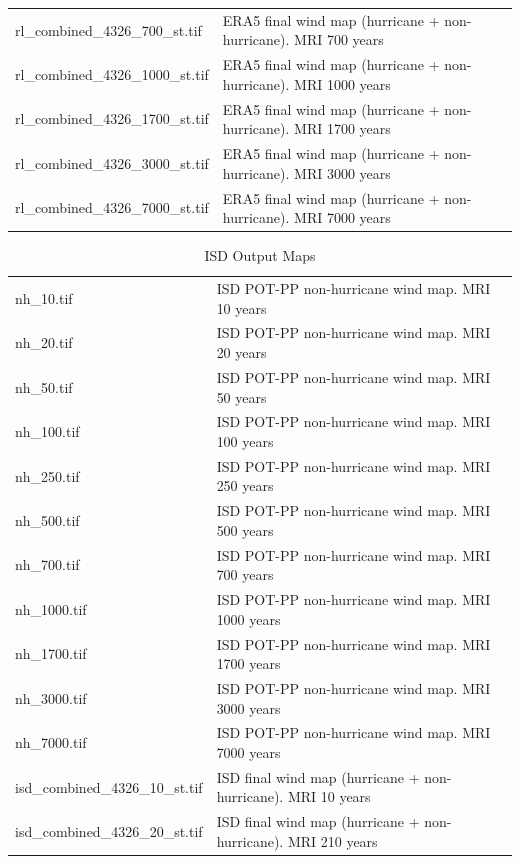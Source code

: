 \documentclass[12pt,twoside]{reedthesis}
\begin{document}
\begin{longtable}[t]{>{\raggedright\arraybackslash}p{2in}>{\raggedright\arraybackslash}p{3.6in}}
rl\_combined\_4326\_700\_st.tif & ERA5 final wind map (hurricane + non-hurricane). MRI 700 years\\
rl\_combined\_4326\_1000\_st.tif & ERA5 final wind map (hurricane + non-hurricane). MRI 1000 years\\
rl\_combined\_4326\_1700\_st.tif & ERA5 final wind map (hurricane + non-hurricane). MRI 1700 years\\
rl\_combined\_4326\_3000\_st.tif & ERA5 final wind map (hurricane + non-hurricane). MRI 3000 years\\
rl\_combined\_4326\_7000\_st.tif & ERA5 final wind map (hurricane + non-hurricane). MRI 7000 years\\
\bottomrule
\end{longtable}
\endgroup{}

\begingroup\fontsize{8}{10}\selectfont
\begin{longtable}[t]{>{\raggedright\arraybackslash}p{2in}>{\raggedright\arraybackslash}p{3.5in}}
\caption[ISD Output Maps]{\label{tab:isdmaps}ISD Output Maps}\\
\toprule
\multicolumn{1}{l}{File} & \multicolumn{1}{l}{Description}\\
\midrule
nh\_10.tif & ISD POT-PP non-hurricane wind map. MRI 10 years\\
nh\_20.tif & ISD POT-PP non-hurricane wind map. MRI 20 years\\
nh\_50.tif & ISD POT-PP non-hurricane wind map. MRI 50 years\\
nh\_100.tif & ISD POT-PP non-hurricane wind map. MRI 100 years\\
nh\_250.tif & ISD POT-PP non-hurricane wind map. MRI 250 years\\
nh\_500.tif & ISD POT-PP non-hurricane wind map. MRI 500 years\\
nh\_700.tif & ISD POT-PP non-hurricane wind map. MRI 700 years\\
nh\_1000.tif & ISD POT-PP non-hurricane wind map. MRI 1000 years\\
nh\_1700.tif & ISD POT-PP non-hurricane wind map. MRI 1700 years\\
nh\_3000.tif & ISD POT-PP non-hurricane wind map. MRI 3000 years\\
nh\_7000.tif & ISD POT-PP non-hurricane wind map. MRI 7000 years\\
isd\_combined\_4326\_10\_st.tif & ISD final wind map (hurricane + non-hurricane). MRI 10 years\\
isd\_combined\_4326\_20\_st.tif & ISD final wind map (hurricane + non-hurricane). MRI 210 years\\

\end{longtable}
\end{document}
